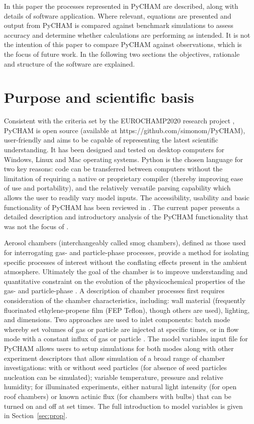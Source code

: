 \documentclass[gmd, manuscript]{copernicus}
\begin{document}
In this paper the processes represented in PyCHAM are described, along with details of software application.  Where relevant, equations are presented and output from PyCHAM is compared against benchmark simulations to assess accuracy and determine whether calculations are performing as intended.  It is not the intention of this paper to compare PyCHAM against observations, which is the focus of future work.  In the following two sections the objectives, rationale and structure of the software are explained.


\section{Purpose and scientific basis}\label{sec:purp}

Consistent with the criteria set by the EUROCHAMP2020 research project \citep{EUROCHAMP2020}, PyCHAM is open source (available at https://github.com/simonom/PyCHAM), user-friendly and aims to be capable of representing the latest scientific understanding.  It has been designed and tested on desktop computers for Windows, Linux and Mac operating systems.  Python is the chosen language for two key reasons: code can be transferred between computers without the limitation of requiring a native or proprietary compiler (thereby improving ease of use and portability), and the relatively versatile parsing capability which allows the user to readily vary model inputs.  The accessibility, usability and basic functionality of PyCHAM has been reviewed in \citet{OMeara2020}.  The current paper presents a detailed description and introductory analysis of the PyCHAM functionality that was not the focus of \citet{OMeara2020}.

Aerosol chambers (interchangeably called smog chambers), defined as those used for interrogating gas- and particle-phase processes, provide a method for isolating specific processes of interest without the conflating effects present in the ambient atmosphere.  Ultimately the goal of the chamber is to improve understanding and quantitative constraint on the evolution of the physicochemical properties of the gas- and particle-phase \citep{Schwantes2017, Charan2019, Hidy2019}.  A description of chamber processes first requires consideration of the chamber characteristics, including: wall material (frequently fluorinated ethylene-propene film (FEP Teflon), though others are used), lighting, and dimensions.  Two approaches are used to inlet components: batch mode whereby set volumes of gas or particle are injected at specific times, or in flow mode with a constant influx of gas or particle \citep{Jaoui2014}.  The model variables input file for PyCHAM allows users to setup simulations for both modes along with other experiment descriptors that allow simulation of a broad range of chamber investigations: with or without seed particles (for absence of seed particles nucleation can be simulated); variable temperature, pressure and relative humidity; for illuminated experiments, either natural light intensity (for open roof chambers) or known actinic flux (for chambers with bulbs) that can be turned on and off at set times.  The full introduction to model variables is given in Section~\ref{sec:prop}.
\end{document}

